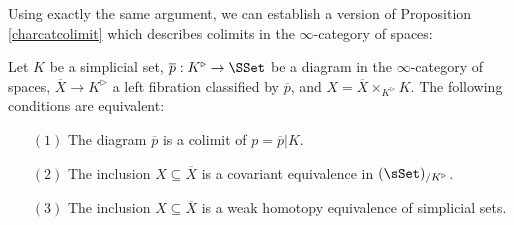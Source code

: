 Using exactly the same argument, we can establish a version of Proposition \ref{charcatcolimit} which describes colimits in the $\infty$-category of spaces:

\begin{proposition}\label{charspacecolimit}
Let $K$ be a simplicial set, $\overline{p}: K^{\triangleright} \rightarrow \SSet$ be a diagram in the $\infty$-category of spaces, $\overline{X} \rightarrow K^{\triangleright}$ a left fibration classified
by $\overline{p}$, and $X = \overline{X} \times_{ K^{\triangleright} } K$.
The following conditions are equivalent:
\begin{itemize}
\item[$(1)$] The diagram $\overline{p}$ is a colimit of $p = \overline{p} | K$.
\item[$(2)$] The inclusion $X \subseteq \overline{X}$ is a covariant equivalence in
$(\sSet)_{/K^{\triangleright}}$.
\item[$(3)$] The inclusion $X \subseteq \overline{X}$
is a weak homotopy equivalence of simplicial sets.
\end{itemize}
\end{proposition}

